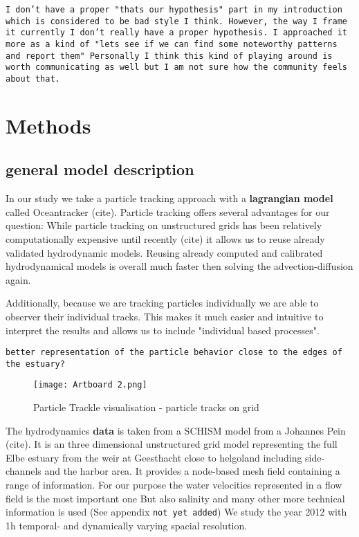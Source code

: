 \texttt{I don't have a proper "thats our hypothesis" part in my introduction which is considered to be bad style I think.
        However, the way I frame it currently I don't really have a proper hypothesis. 
        I approached it more as a kind of "lets see if we can find some noteworthy patterns and report them"
        Personally I think this kind of playing around is worth communicating as well but I am not sure how the community feels about that.}

\section*{Methods}

\subsection*{general model description}

In our study we take a particle tracking approach with a \textbf{lagrangian model} called Oceantracker (cite).
Particle tracking offers several advantages for our question:
While particle tracking on unstructured grids has been relatively computationally expensive until recently (cite)
 it allows us to reuse already validated hydrodynamic models.
Reusing already computed and calibrated hydrodynamical models is overall much faster then solving the advection-diffusion again.

Additionally, because we are tracking particles individually we are able to observer their individual tracks.
This makes it much easier and intuitive to interpret the results and allows us to  include "individual based processes".

\texttt{better representation of the particle behavior close to the edges of the estuary?}

\begin{figure}
    \texttt{[image: Artboard 2.png]}
    \caption{Particle Trackle visualisation - particle tracks on grid}
\end{figure}

The hydrodynamics \textbf{data} is taken from a SCHISM model from a Johannes Pein (cite).
It is an three dimensional unstructured  grid model representing the full Elbe estuary from the weir at Geesthacht close to helgoland including side-channels and the harbor area.
It provides a node-based mesh field containing a range of information.
For our purpose the water velocities represented in a flow field is the most important one
But also salinity and many other more technical information is used (See appendix \texttt{not yet added})
We study the year 2012 with 1h temporal- and dynamically varying spacial resolution.

